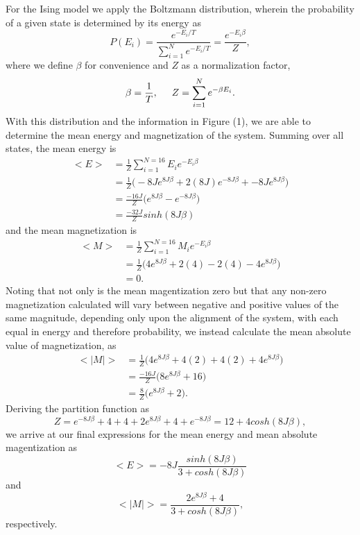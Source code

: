 \documentclass[11pt,a4paper]{article}
\begin{document}
For the Ising model we apply the Boltzmann distribution, wherein the probability of a given state is determined by its energy as
\begin{equation}
P(E_i) = \frac{e^{-E_i/T}}{\sum\limits^N_{i=1} e^{-E_i/T}} = \frac{e^{-E_i\beta}}{Z},
\end{equation}
where we define $\beta$ for convenience and $Z$ as a normalization factor,
\begin{equation}
\beta = \frac{1}{T}, \hspace{0.5 cm} Z = \sum\limits^N_{i=1} e^{-\beta E_i}.
\end{equation}
With this distribution and the information in Figure (1), we are able to determine the mean energy and magnetization of the system. Summing over all states, the mean energy is 
\begin{align*}
<E> &= \frac{1}{Z}\sum\limits^{N=16}_{i=1} E_i e^{-E_i\beta} \\
	&= \frac{1}{Z}\bigg( -8Je^{8J\beta} + 2(8J)e^{-8J\beta} + -8Je^{8J\beta} \bigg) \\
	&= \frac{-16J}{Z}\bigg(e^{8J\beta} - e^{-8J\beta}\bigg) \\
	&= \frac{-32J}{Z}sinh(8J\beta)
\end{align*}
and the mean magnetization is
\begin{align*}
<M> &= \frac{1}{Z}\sum\limits^{N=16}_{i=1} M_i e^{-E_i\beta} \\
	&= \frac{1}{Z}\bigg( 4e^{8J\beta} + 2(4) - 2(4) - 4e^{8J\beta} \bigg) \\
	&= 0.
\end{align*}
Noting that not only is the mean magentization zero but that any non-zero magnetization calculated will vary between negative and positive values of the same magnitude, depending only upon the alignment of the system, with each equal in energy and therefore probability, we instead calculate the mean absolute value of magnetization, as
\begin{align*}
<|M|> 	&= \frac{1}{Z}\bigg( 4e^{8J\beta} + 4(2) + 4(2) + 4e^{8J\beta} \bigg) \\
		&= \frac{-16J}{Z}\bigg(8e^{8J\beta} + 16\bigg) \\
		&= \frac{8}{Z}\bigg(e^{8J\beta} + 2\bigg).
\end{align*}
Deriving the partition function as 
\begin{equation}
Z = e^{-8J\beta} + 4 + 4 + 2e^{8J\beta} + 4 + e^{-8J\beta} = 12 + 4cosh(8J\beta),
\end{equation}
we arrive at our final expressions for the mean energy and mean absolute magentization as
\begin{equation}
<E> = -8J\frac{sinh(8J\beta)}{3 + cosh(8J\beta)}
\end{equation}
and
\begin{equation}
<|M|> = \frac{2e^{8J\beta} + 4}{3+cosh(8J\beta)},
\end{equation}
respectively.
\end{document}
